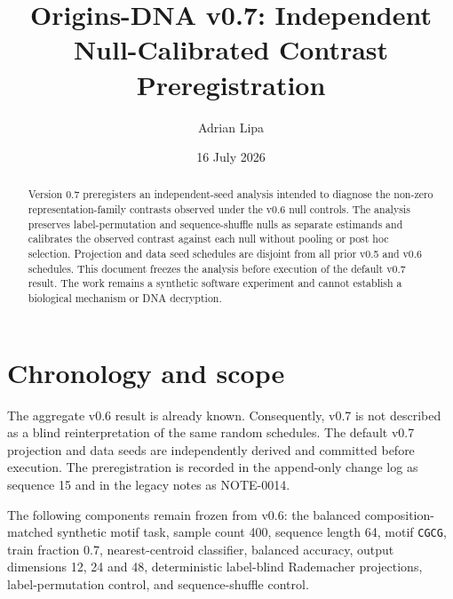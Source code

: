 \documentclass[11pt]{article}
\title{Origins-DNA v0.7: Independent Null-Calibrated Contrast Preregistration}
\author{Adrian Lipa}
\date{16 July 2026}
\begin{document}
\maketitle

\begin{abstract}
Version 0.7 preregisters an independent-seed analysis intended to diagnose the non-zero representation-family contrasts observed under the v0.6 null controls. The analysis preserves label-permutation and sequence-shuffle nulls as separate estimands and calibrates the observed contrast against each null without pooling or post hoc selection. Projection and data seed schedules are disjoint from all prior v0.5 and v0.6 schedules. This document freezes the analysis before execution of the default v0.7 result. The work remains a synthetic software experiment and cannot establish a biological mechanism or DNA decryption.
\end{abstract}

\section{Chronology and scope}
The aggregate v0.6 result is already known. Consequently, v0.7 is not described as a blind reinterpretation of the same random schedules. The default v0.7 projection and data seeds are independently derived and committed before execution. The preregistration is recorded in the append-only change log as sequence 15 and in the legacy notes as NOTE-0014.

The following components remain frozen from v0.6: the balanced composition-matched synthetic motif task, sample count 400, sequence length 64, motif \texttt{CGCG}, train fraction 0.7, nearest-centroid classifier, balanced accuracy, output dimensions 12, 24 and 48, deterministic label-blind Rademacher projections, label-permutation control, and sequence-shuffle control.
\end{document}
